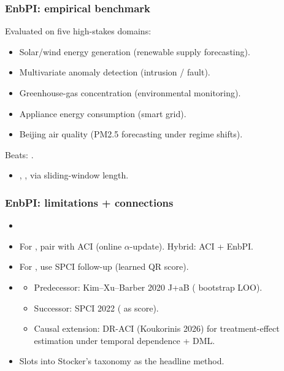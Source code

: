 \documentclass[11pt, aspectratio=169, xcolor={dvipsnames}, usepdftitle=false]{beamer}
\begin{document}
\begin{frame}
\frametitle{EnbPI: empirical benchmark}
Evaluated on five high-stakes domains:
\begin{itemize}
\item Solar/wind energy generation (renewable supply forecasting).
\item Multivariate anomaly detection (intrusion / fault).
\item Greenhouse-gas concentration (environmental monitoring).
\item Appliance energy consumption (smart grid).
\item Beijing air quality (PM2.5 forecasting under regime shifts).
\end{itemize}
Beats: .
\begin{itemize}
\item {}, ,  via sliding-window length.
\end{itemize}
\end{frame}

\begin{frame}
\frametitle{EnbPI: limitations + connections}
\begin{itemize}
\item {}
\item For , pair with ACI (online $\alpha$-update). Hybrid: ACI + EnbPI.
\item For , use SPCI follow-up (learned QR score).
\item {}
\begin{itemize}
\item Predecessor: Kim--Xu--Barber 2020 J+aB ( bootstrap LOO).
\item Successor: SPCI 2022 ( as score).
\item Causal extension: DR-ACI (Koukorinis 2026) for treatment-effect estimation under temporal dependence + DML.
\end{itemize}
\item Slots into Stocker's taxonomy as the headline  method.
\end{itemize}
\end{frame}
\end{document}
